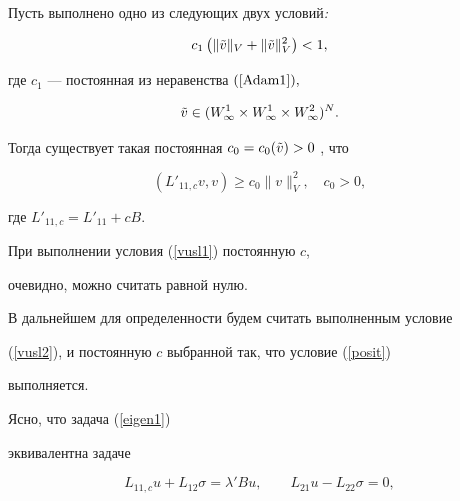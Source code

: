\begin{lem}


Пусть выполнено одно из следующих двух условий{\em :}


\begin{equation}


\label{vusl1}


c_1 \left ( \|\Tilde v\|_V +\|\Tilde v\|_V^2 \right ) < 1,


\end{equation}


где $ c_1$ --- постоянная из неравенства $(\ref{Adam1}),$


\begin{equation}


\label{vusl2}


\Tilde v \in ( W^1_\infty \times W^1_\infty \times W^2_


\infty )^N.


\end{equation}


Тогда существует такая постоянная $c_0 = c_0(\Tilde v) > 0$ , что 


\begin{equation}


\label{posit}


(L'_{11,c}v, v ) \ge c_0 \|v \|_V^2, \quad c_0 > 0,


\end{equation}


где $L'_{11,c} = L'_{11} + cB $.


\end{lem}


\begin{note}


При выполнении условия (\ref{vusl1}) постоянную $c$, 


очевидно, можно считать равной нулю.


\end{note}





В дальнейшем для определенности будем считать выполненным условие 


(\ref{vusl2}), и постоянную $c$ выбранной так, что условие (\ref{posit}) 


выполняется.


Ясно, что задача (\ref{eigen1})


эквивалентна задаче 


\begin{equation}


\label{eigp1}


L_{11,c}u + L_{12} \sigma = \lambda 'Bu, \qquad


L_{21} u - L_{22} \sigma = 0,


\end{equation}


